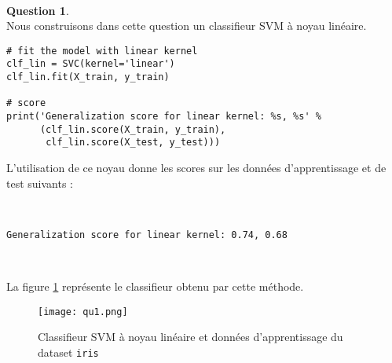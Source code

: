 \documentclass[11pt,a4paper]{article}
\theoremstyle{definition}
\newtheorem{Qu}{Question}
\begin{document}
\

\begin{Qu}~\\

 Nous construisons dans cette question un classifieur SVM à noyau linéaire. 

\begin{verbatim}
# fit the model with linear kernel
clf_lin = SVC(kernel='linear')
clf_lin.fit(X_train, y_train)

# score
print('Generalization score for linear kernel: %s, %s' %
      (clf_lin.score(X_train, y_train),
       clf_lin.score(X_test, y_test)))
\end{verbatim}

L'utilisation de ce noyau donne les scores sur les données d'apprentissage et de test suivants :

\

\texttt{Generalization score for linear kernel: 0.74, 0.68}

\

La figure \ref{qu1} représente le classifieur obtenu par cette méthode.

\begin{figure}[h!]\centering
\texttt{[image: qu1.png]}
\caption{Classifieur SVM à noyau linéaire et données d'apprentissage du dataset \texttt{iris}}
\label{qu1}
\end{figure}


\end{Qu}

\
\end{document}

